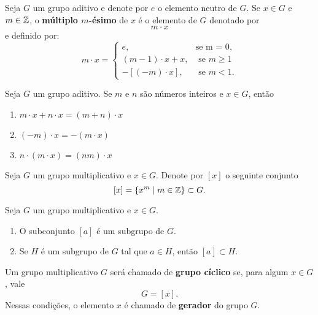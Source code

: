 \documentclass{beamer}
\begin{document}
    \begin{frame}
        Seja $G$ um grupo aditivo e denote por $e$ o elemento neutro de $G$. Se $x \in G$ e $m \in \mathbb{Z}$, o \textbf{múltiplo $m$-ésimo} de $x$ é o elemento de $G$ denotado por
        \[
            m \cdot x
        \]
        e definido por:
        \[
            m \cdot x = \begin{cases}
                    e, & \mbox{se m = 0},\\
                    (m - 1)\cdot x + x, & \mbox{ se } m \ge 1\\
                    -[(-m) \cdot x], & \mbox{ se } m < 1. 
                   \end{cases}
        \]
    \end{frame}

    \begin{frame}
        \begin{proposicao}
            Seja $G$ um grupo aditivo. Se $m$ e $n$ são números inteiros e $x \in G$, então
            \begin{enumerate}[label={\arabic*})]
                \item $m \cdot x + n \cdot x = (m + n) \cdot x$

                \item $(-m) \cdot x = -(m \cdot x)$

                \item $n\cdot (m \cdot x) = (nm)\cdot x$
            \end{enumerate}
        \end{proposicao}
    \end{frame}

    \begin{frame}
        Seja $G$ um grupo multiplicativo e $x \in G$. Denote por $[x]$ o seguinte conjunto
        \[
            [x] = \{x^m \mid m \in \mathbb{Z}\} \subset G.
        \]

        \begin{proposicao}
            Seja $G$ um grupo multiplicativo e $x \in G$.
            \begin{enumerate}[label={\arabic*})]
                \item O subconjunto $[a]$ é um subgrupo de $G$.

                \item Se $H$ é um subgrupo de $G$ tal que $a \in H$, então $[a] \subset H$.
            \end{enumerate}
        \end{proposicao}
    \end{frame}

    \begin{frame}
        \begin{definicao}
            Um grupo multiplicativo $G$ será chamado de \textbf{grupo cíclico} se, para algum $x \in G$, vale
            \[
                G = [x].
            \]
            Nessas condições, o elemento $x$ é chamado de \textbf{gerador} do grupo $G$.
        \end{definicao}
    \end{frame}
\end{document}
